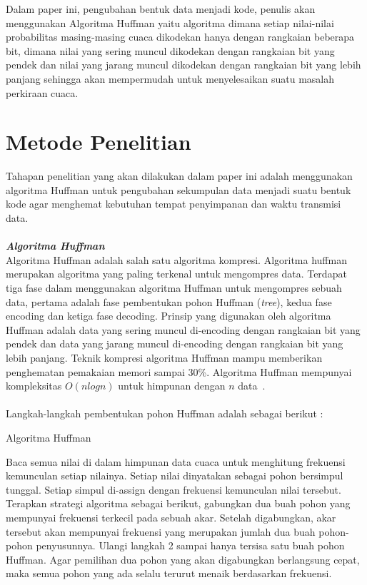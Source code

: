 \documentclass[journal]{IEEEtran}
\begin{document}
\hspace*{0.6cm}Dalam paper ini, pengubahan bentuk data menjadi kode, penulis akan menggunakan Algoritma Huffman yaitu algoritma dimana setiap nilai-nilai probabilitas masing-masing cuaca dikodekan hanya dengan rangkaian beberapa bit, dimana nilai yang sering muncul dikodekan dengan rangkaian bit yang pendek dan nilai yang jarang muncul dikodekan dengan rangkaian bit yang lebih panjang sehingga akan mempermudah untuk menyelesaikan suatu masalah perkiraan cuaca.\\
\vspace*{2cm}
\section{Metode Penelitian}
	\hspace*{0.3cm}Tahapan penelitian yang akan dilakukan dalam paper ini adalah menggunakan algoritma Huffman untuk pengubahan sekumpulan data menjadi suatu bentuk kode agar menghemat kebutuhan tempat penyimpanan dan waktu transmisi data.\\
\\
\textbf{\textit{Algoritma Huffman}}\\
\hspace*{0.7cm}Algoritma Huffman adalah salah satu algoritma kompresi. Algoritma huffman merupakan algoritma yang paling terkenal untuk mengompres data. Terdapat tiga fase dalam menggunakan algoritma Huffman untuk mengompres sebuah data, pertama adalah fase pembentukan pohon Huffman (\textit{tree}), kedua fase encoding dan ketiga fase decoding. Prinsip yang digunakan oleh algoritma Huffman adalah data yang sering muncul di-encoding dengan rangkaian bit yang pendek dan data yang jarang muncul di-encoding dengan rangkaian bit yang lebih panjang. Teknik kompresi algoritma Huffman mampu memberikan penghematan pemakaian memori sampai 30\%. Algoritma Huffman mempunyai kompleksitas $O(n log n)$ untuk himpunan dengan $n$ data~\cite{3}.\\
\\
Langkah-langkah pembentukan pohon Huffman adalah sebagai berikut :
\vspace*{0.5cm}
\begin{algorithm}[H]
	\caption{Algoritma Huffman}\label{alg:huffman}
	\begin{algorithmic}[1]
		\State Baca semua nilai di dalam himpunan data cuaca untuk menghitung frekuensi kemunculan setiap nilainya. Setiap nilai dinyatakan sebagai pohon bersimpul tunggal. Setiap simpul di-assign dengan frekuensi kemunculan nilai tersebut.
		\State Terapkan strategi algoritma sebagai berikut, gabungkan dua buah pohon yang mempunyai frekuensi terkecil pada sebuah akar. Setelah digabungkan, akar tersebut akan mempunyai frekuensi yang merupakan jumlah dua buah pohon-pohon penyusunnya.
		\State Ulangi langkah 2 sampai hanya tersisa satu buah pohon Huffman. Agar pemilihan dua pohon yang akan digabungkan berlangsung cepat, maka semua pohon yang ada selalu terurut menaik berdasarkan frekuensi.
	\end{algorithmic}
\end{algorithm}
\end{document}

